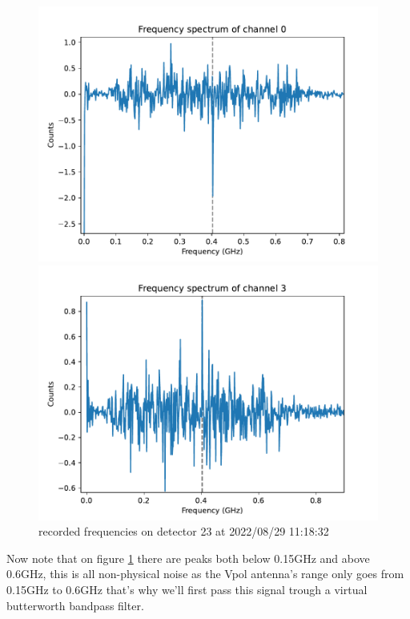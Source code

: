 \begin{figure}
	\begin{minipage}{0.49\textwidth}
		\includegraphics[width=\textwidth]{figures/23-800-0-freq.pdf}
	\end{minipage}
	\begin{minipage}{0.49\textwidth}
		\includegraphics[width=\textwidth]{figures/23-800-3-freq.pdf}
	\end{minipage}
	\caption{recorded frequencies on detector 23 at 2022/08/29 11:18:32}
	\label{fig:freqs03}
\end{figure}
Now note that on figure \ref{fig:freqs03} there are peaks both below 0.15GHz and above 0.6GHz,
this is all non-physical noise as the Vpol antenna's range only goes from
0.15GHz to 0.6GHz \cite{Aguilar_2021} that's why we'll first pass this signal
trough a virtual butterworth bandpass filter.

